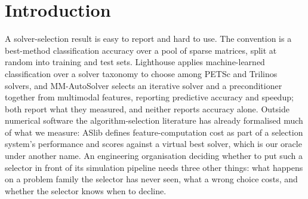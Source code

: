 \documentclass[11pt]{article}
\begin{document}
\begin{abstract}
converges, from six to twelve. The Ritz condition estimate alone beats the full
twelve-feature selector at the median, $0.00$ against $0.10$, and is catastrophic
in the tail, $2.18$ against $0.35$: it fails our registered baseline-to-beat test
at the median, and the other eleven features earn their place only in the tail. On twenty-three of sixty-five operators
the fastest method is unpreconditioned conjugate gradients, so a selector
restricted to preconditioners would be wrong on a third of this grid by
construction. And on three of sixty-five operators the probe costs more than the whole
fastest solve it is meant to inform, by up to a factor of seven; charging that
probe to the selector on every operator, as a deployment must, moves median
regret from $0.10$ to $0.41$ and the tail from $0.35$ to $3.40$. We also report
that on twenty-five of four hundred and thirty-two runs the recurrence residual
carried inside conjugate gradients announced a convergence that the true residual
did not support, so a harness trusting it would have recorded speedups that did
not happen. The pre-registration, the generators, the solvers and the hashed
result files accompany the paper, and we say which experiments did not
run.
\end{abstract}

\section{Introduction}

A solver-selection result is easy to report and hard to use. The convention is a
best-method classification accuracy over a pool of sparse matrices, split at
random into training and test sets. Lighthouse \cite{lighthouse} applies
machine-learned classification over a solver taxonomy to choose among PETSc and
Trilinos solvers, and MM-AutoSolver \cite{mmauto} selects an iterative solver and
a preconditioner together from multimodal features, reporting predictive accuracy and
speedup; both report what they measured, and neither reports accuracy alone.
Outside numerical software the algorithm-selection literature has already formalised much
of what we measure: ASlib \cite{aslib} defines feature-computation cost as part of a
selection system's performance and scores against a virtual best solver, which is our
oracle under another name. An engineering
organisation deciding whether to put such a selector in front of its simulation
pipeline needs three other things: what happens on a problem family the selector
has never seen, what a wrong choice costs, and
whether the selector knows when to decline.
\end{document}
